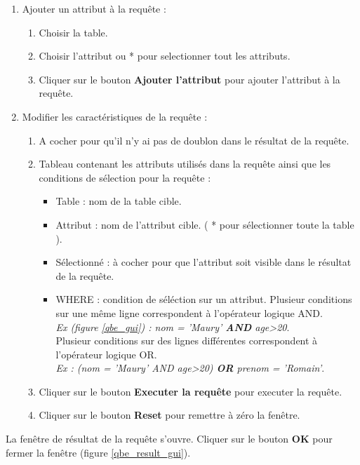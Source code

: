 \begin{enumerate}
\item Ajouter un attribut à la requête :
\begin{enumerate}
\item Choisir la table.
\item Choisir l'attribut ou * pour selectionner tout les attributs.
\item Cliquer sur le bouton \textbf{Ajouter l'attribut} pour ajouter l'attribut à la requête.
\end{enumerate}
\item Modifier les caractéristiques de la requête :
\begin{enumerate}
\item A cocher pour qu'il n'y ai pas de doublon dans le résultat de la requête.
\item Tableau contenant les attributs utilisés dans la requête ainsi que les conditions de sélection pour la requête :
\begin{itemize}
\item Table : nom de la table cible.
\item Attribut : nom de l'attribut cible. ( * pour sélectionner toute la table ).
\item Sélectionné : à cocher pour que l'attribut soit visible dans le résultat de la requête.
\item WHERE : condition de séléction sur un attribut. 
Plusieur conditions sur une même ligne correspondent à l'opérateur logique AND. \\
\textit{Ex (figure \ref{qbe_gui}) : nom = 'Maury' \textbf{AND} age>20}.\\
Plusieur conditions sur des lignes différentes correspondent à l'opérateur logique OR.\\
 \textit{Ex : (nom = 'Maury' AND age>20) \textbf{OR} prenom = 'Romain'}.\\
\end{itemize}
\item Cliquer sur le bouton \textbf{Executer la requête} pour executer la requête.
\item Cliquer sur le bouton \textbf{Reset} pour remettre à zéro la fenêtre.
\end{enumerate}
\end{enumerate}

La fenêtre de résultat de la requête s'ouvre. Cliquer sur le bouton \textbf{OK} pour fermer la fenêtre (figure \ref{qbe_result_gui}).

